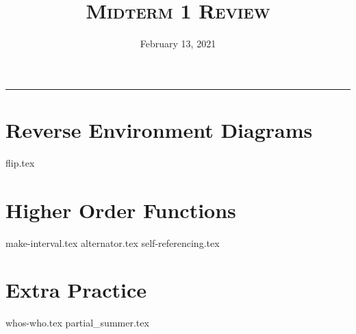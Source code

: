 \documentclass{exam}
\title{\textsc{Midterm 1 Review}}
\date{February 13, 2021}
\begin{document}
\maketitle
\rule{\textwidth}{0.15em}
\fontsize{12}{15}\selectfont



\newpage
\section{Reverse Environment Diagrams}
\begin{questions}
{flip.tex}
\end{questions}

\newpage
\section{Higher Order Functions}
\begin{questions}
{make-interval.tex}
{alternator.tex}
{self-referencing.tex}
\end{questions}

\section{Extra Practice}
\begin{questions}
{whos-who.tex}
{partial_summer.tex}
\end{questions}
\end{document}
